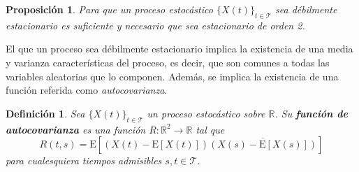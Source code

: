 \documentclass[12pt,letterpaper,draft]{book}
\newtheorem{definicion}{Definición}[chapter]
\newtheorem{proposicion}[teorema]{Proposición}
\newcommand{\R}{\mathbb{R}}
\newcommand{\E}[1]{\mathrm{E}\left[ #1 \right]}
\newcommand{\Var}[1]{\mathrm{Var}\left( #1 \right)}
\newcommand{\xt}{$\{X(t)\}_{t\in \mathcal{T}}$ }
\begin{document}
\begin{proposicion}
Para que un proceso estocástico \xt sea débilmente estacionario es suficiente y necesario que sea estacionario de orden 2.
\end{proposicion}

%

El que un proceso sea débilmente estacionario implica la existencia de una media y varianza características del proceso, es decir, que son comunes a todas las variables aleatorias que lo componen. 
%
Además, se implica la existencia de una función referida como \textit{autocovarianza}.

\begin{definicion}
Sea \xt un proceso estocástico sobre $\R$. Su \textbf{función de autocovarianza} es una función $R: \R^{2}\rightarrow \R$ tal que
\begin{equation}
R(t,s) = \E{\left(X(t) - \E{X(t)}\right)\overline{\left(X(s) - \E{X(s)}\right)}}
\end{equation} 
para cualesquiera tiempos admisibles $s, t \in \mathcal{T}$.
\end{definicion}
\end{document}
